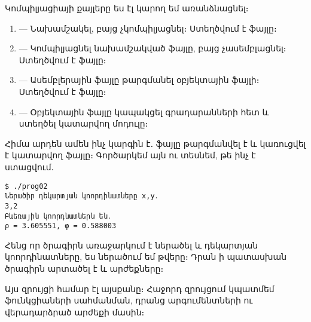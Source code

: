 Կոմպիլյացիայի քայլերը ես էլ կարող եմ առանձնացնել։

\begin{enumerate}
\item {} --- Նախամշակել, բայց
  չկոմպիլյացնել։ Ստեղծվում է  ֆայլը։
\item {} --- Կոմպիլյացնել նախամշակված
  ֆայլը, բայց չասեմբլացնել։ Ստեղծվում է  ֆայլը։
\item {} --- Ասեմբլերային ֆայլը
  թարգմանել օբյեկտային ֆայլի։ Ստեղծվում է  ֆայլը։
\item {} --- Օբյեկտային ֆայլը կապակցել
  գրադարանների հետ և ստեղծել  կատարվող մոդուլը։
\end{enumerate}

Հիմա արդեն ամեն ինչ կարգին է․ ֆայլը թարգմանվել է և կառուցվել է
 կատարվող ֆայլը։ Գործարկեմ այն ու տեսնեմ, թե ինչ է
ստացվում․

\begin{verbatim}
$ ./prog02
Ներածիր դեկարտյան կոորդինատները x,y․
3,2
Բևեռային կոորդնատներն են․
ρ = 3.605551, φ = 0.588003
\end{verbatim}

Հենց որ ծրագիրն առաջարկում է ներածել  և  դեկարտյան
կոորդինատները, ես ներածում եմ  թվերը։ Դրան ի պատասխան
ծրագիրն արտածել է  և 
արժեքները։

Այս զրույցի համար էլ այսքանը։ Հաջորդ զրույցում կպատմեմ ֆունկցիաների
սահմանման, դրանց արգումենտների ու վերադարձրած արժեքի մասին։
